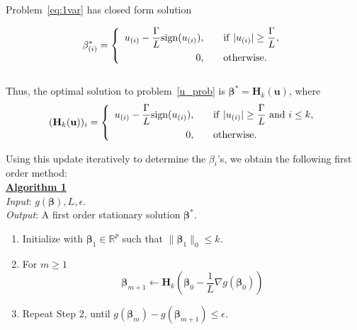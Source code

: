 \documentclass[12pt]{article}
\newcommand{\M}{\mathbf}
\newcommand{\MS}{\boldsymbol}
\newcommand{\R}{\mathbb{R}}
\newcommand{\1}{\mathds{1}}
\begin{document}
Problem~\ref{eq:1var} has closed form solution

\begin{equation}
\beta_{(i)}^* = \left\{\begin{array}{rl} 
u_{(i)} - \displaystyle \frac{\Gamma}{L}\text{sign}(u_{(i)}), &~~~{\rm if}~|u_{(i)}| \ge \displaystyle \frac{\Gamma}{L}, \vspace{5pt}\\
0, &~~~\rm{otherwise.}
\end{array} \right.
\end{equation}\\

Thus, the optimal solution to problem~\ref{u_prob} is $\MS \beta^* = \M H_k(\M u)$, where
\begin{equation}
(\M H_k(\M u))_i = \left\{\begin{array}{rl} 
u_{(i)} - \displaystyle \frac{\Gamma}{L}\text{sign}(u_{(i)}), &~~~{\rm if}~|u_{(i)}| \ge \displaystyle \frac{\Gamma}{L}~{\rm and}~i \le k, \vspace{5pt}\\
0, &~~~\rm{otherwise.}
\end{array} \right.
\end{equation}

Using this update iteratively to determine the $\beta_i$'s, we obtain the following first order method:\\

\underline{\bf Algorithm 1}\\

\emph{Input}: $g(\MS \beta), L, \epsilon$.\\

\emph{Output}: A first order stationary solution $\MS \beta^*$.

\begin{enumerate}
	\item Initialize with $\MS \beta_1 \in \R^p$ such that $\|\MS \beta_1\|_0 \le k$.
	\item For $m \ge 1$
	\[
	\MS \beta_{m+1} \leftarrow \M H_k(\MS \beta_0 - \frac{1}{L} \nabla g(\MS \beta_0))
	\]
	\item Repeat Step 2, until $g(\MS \beta_m) - g(\MS \beta_{m+1}) \le \epsilon$.
\end{enumerate}
\end{document}
